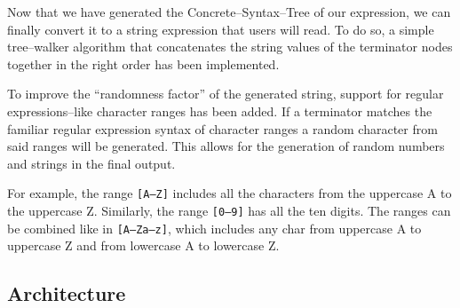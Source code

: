 \documentclass[]{usiinfbachelorproject}
\begin{document}
Now that we have generated the Concrete–Syntax–Tree of our expression, we
can finally convert it to a string expression that users will read.
To do so, a simple tree–walker algorithm that concatenates the string values of
the terminator nodes together in the right order has been implemented.

To improve the ``randomness factor'' of the generated string, support
for regular expressions–like character ranges has been added. If a terminator
matches the familiar regular expression syntax of character ranges a random
character from said ranges will be generated. This allows for the generation of
random numbers and strings in the final output.

For example, the range \texttt{[A–Z]} includes all the characters from the
uppercase A to the uppercase Z. Similarly, the range \texttt{[0–9]} has all
the ten digits. The ranges can be combined like in \texttt{[A–Za–z]}, which
includes any char from uppercase A to uppercase Z and from lowercase A to
lowercase Z.




\subsection{Architecture}\label{impl-arch}

\end{document}
